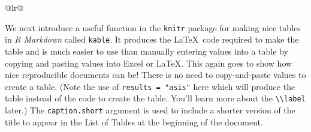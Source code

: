 \documentclass[12pt,twoside]{reedthesis}
\begin{document}
\begin{longtable}[c]{@{}lr@{}}
\begin{Shaded}
\begin{Highlighting}[]
  
  \end{Highlighting}
  \end{Shaded}
  
  We next introduce a useful function in the \texttt{knitr} package for
  making nice tables in \emph{R Markdown} called \texttt{kable}. It
  produces the \LaTeX~code required to make the table and is much easier
  to use than manually entering values into a table by copying and pasting
  values into Excel or \LaTeX. This again goes to show how nice
  reproducible documents can be! There is no need to copy-and-paste values
  to create a table. (Note the use of \texttt{results\ =\ "asis"} here
  which will produce the table instead of the code to create the table.
  You'll learn more about the
  \texttt{\textbackslash{}\textbackslash{}label} later.) The
  \texttt{caption.short} argument is used to include a shorter version of
  the title to appear in the List of Tables at the beginning of the
  document.
  
  \begin{Shaded}
  \begin{Highlighting}[]
   \CharTok{\textbackslash{}\textbackslash{}}\NormalTok{,} \NormalTok{)}
  \end{Highlighting}
  \end{Shaded}
  

\end{longtable}
\end{document}

